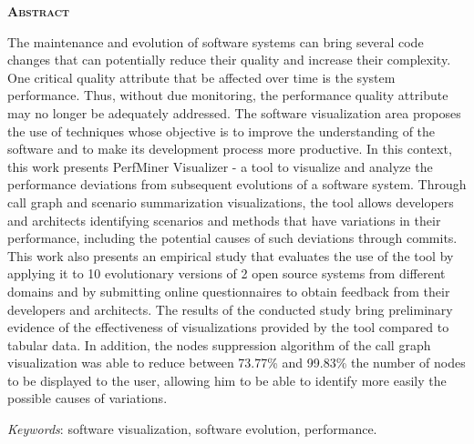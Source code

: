 \begin{center}
	{\Large{\textbf{\mscThesisEnglishTitle}}}
\end{center}

\vspace{1cm}


\vspace{1cm}

\begin{center}
	\Large{\textsc{\textbf{Abstract}}}
\end{center}

\noindent The maintenance and evolution of software systems can bring several code changes that can potentially reduce their quality and increase their complexity. One critical quality attribute that be affected over time is the system performance. Thus, without due monitoring, the performance quality attribute may no longer be adequately addressed. The software visualization area proposes the use of techniques whose objective is to improve the understanding of the software and to make its development process more productive. In this context, this work presents PerfMiner Visualizer - a tool to visualize and analyze the performance deviations from subsequent evolutions of a software system. Through call graph and scenario summarization visualizations, the tool allows developers and architects identifying scenarios and methods that have variations in their performance, including the potential causes of such deviations through commits. This work also presents an empirical study that evaluates the use of the tool by applying it to 10 evolutionary versions of 2 open source systems from different domains and by submitting online questionnaires to obtain feedback from their developers and architects. The results of the conducted study bring preliminary evidence of the effectiveness of visualizations provided by the tool compared to tabular data. In addition, the nodes suppression algorithm of the call graph visualization was able to reduce between 73.77\% and 99.83\% the number of nodes to be displayed to the user, allowing him to be able to identify more easily the possible causes of variations.

\noindent\textit{Keywords}: software visualization, software evolution, performance.